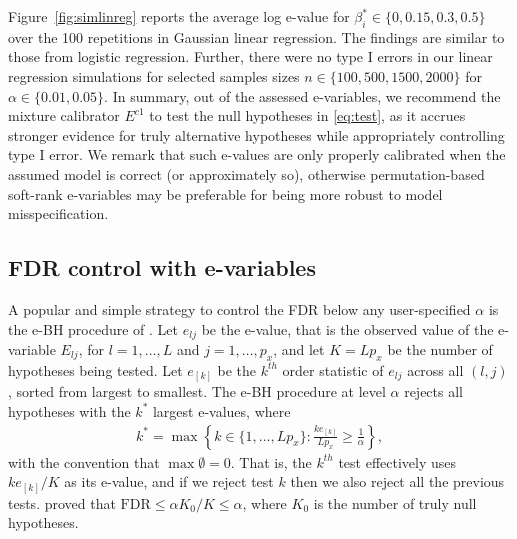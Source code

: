\documentclass[pdflatex,sn-mathphys-num]{sn-jnl}%
\theoremstyle{thmstyleone}%
\theoremstyle{thmstyletwo}%
\theoremstyle{thmstylethree}%
\begin{document}
Figure~\ref{fig:simlinreg} reports the average log e-value for $\beta_i^*\in \{0, 0.15, 0.3, 0.5\}$ over the 100 repetitions in Gaussian linear regression. The findings are similar to those from logistic regression. Further, there were no type I errors in our linear regression simulations for selected samples sizes $n\in\{100, 500, 1500, 2000\}$ for $\alpha \in \{0.01,0.05\}$. In summary, out of the assessed e-variables, we recommend the mixture calibrator $E^{c1}$ to test the null hypotheses in \eqref{eq:test}, as it accrues stronger evidence for truly alternative hypotheses while appropriately controlling type I error. We remark that such e-values are only properly calibrated when the assumed model is correct (or approximately so), otherwise permutation-based soft-rank e-variables may be preferable for being more robust to model misspecification.


\subsection{FDR control with e-variables}
\label{ssec:fdr_control}

A popular and simple strategy to control the FDR below any user-specified $\alpha$ is the e-BH procedure of \cite{wang_ruodu:2022}.
Let $e_{lj}$ be the e-value, that is the observed value of the e-variable $E_{lj}$, for $l=1,\ldots,L$ and $j=1,\ldots,p_x$, and let $K= L p_x$ be the number of hypotheses being tested.
Let $e_{[k]}$ be the $k^{th}$ order statistic of $e_{lj}$ across all $(l,j)$, sorted from largest to smallest. The e-BH procedure at level $\alpha$ rejects all hypotheses with the $k^*$ largest e-values, where
\begin{align}
 k^*= \max \left\{ k \in \{1, \ldots, L p_x \} : \frac{k e_{[k]}}{L p_x} \geq \frac{1}{\alpha}  \right\},
\nonumber
\end{align}
with the convention that $\max \emptyset = 0$.
That is, the $k^{th}$ test effectively uses $k e_{[k]} / K$ as its e-value, and if we reject test $k$ then we also reject all the previous tests.
\cite{wang_ruodu:2022} proved that 
$\mbox{FDR} \leq \alpha K_0 / K \leq \alpha$, where $K_0$ is the number of truly null hypotheses.
\end{document}
